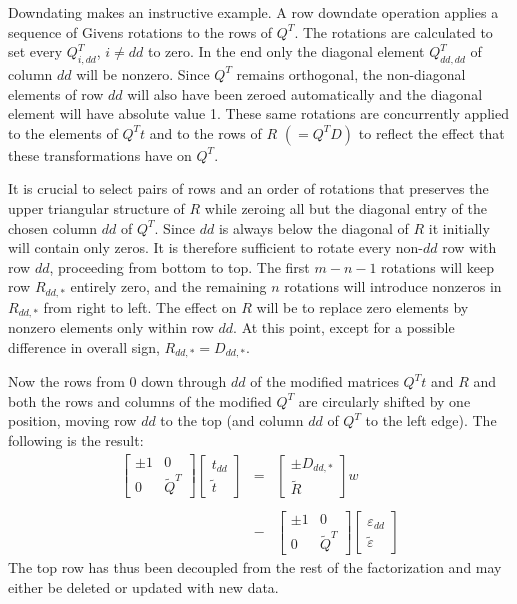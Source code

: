 Downdating makes an instructive example. A row downdate operation applies
a sequence of Givens rotations to the rows of $Q^T$.
The rotations are calculated to set every $Q^T_{i,dd}$, $i \neq dd$ to zero.
In the end only the diagonal element $Q^T_{dd,dd}$ of column $dd$ will be nonzero.
Since $Q^T$ remains orthogonal, the non-diagonal elements of row $dd$ will also have been zeroed automatically
and the diagonal element will have absolute value 1.
These same rotations are concurrently applied to the elements of $Q^T t$ and to the rows of $R$ $(= Q^T D)$
to reflect the effect that these transformations have on $Q^T$.

It is crucial to select pairs of rows and an order of rotations that preserves the upper triangular structure of $R$
while zeroing all but the diagonal entry of the chosen column $dd$ of $Q^T$.
Since $dd$ is always below the diagonal of $R$ it initially will contain only zeros.
It is therefore sufficient to rotate every non-$dd$ row with row $dd$, proceeding from bottom to top.
The first $m - n - 1$ rotations will keep row $R_{dd,*}$ entirely zero,
and the remaining $n$ rotations will introduce nonzeros in $R_{dd,*}$ from right to left.
The effect on $R$ will be to replace zero elements by nonzero elements only within row $dd$.
At this point, except for a possible difference in overall sign, $R_{dd,*} = D_{dd,*}$.

Now the rows from 0 down through $dd$ of the modified matrices $Q^Tt$ and $R$ and both the rows and columns of the modified $Q^T$
are circularly shifted by one position, moving row $dd$ to the top (and column $dd$ of $Q^T$ to the left edge).
The following is the result:
\begin{displaymath}
\begin{array}{lll}
    \left[\begin{array}{cc}
      \pm1  &  0 \\
      0     &  \tilde{Q}^T
   \end{array}\right]
   \left[\begin{array}{c}
      t_{dd} \\
      \tilde{t}
   \end{array}\right]
   &=&
   \left[\begin{array}{c}
      \pm D_{dd,*} \\
      \tilde{R}
   \end{array}\right] w
   \\
   \\
   &-&
   \left[\begin{array}{cc}
      \pm1  &  0 \\
      0     &  \tilde{Q}^T
   \end{array}\right]
   \left[\begin{array}{c}
      \varepsilon_{dd} \\
      \tilde{\varepsilon}
   \end{array}\right]
\end{array}
\end{displaymath}
The top row has thus been decoupled from the rest of the factorization and may either be deleted or updated with new data.

